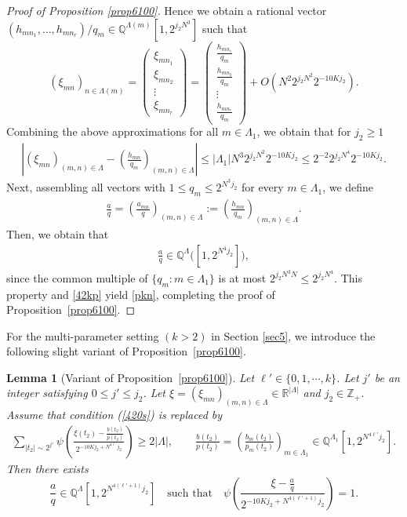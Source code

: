 \documentclass[10pt,a4paper]{amsart}
\newtheorem{lemma}{Lemma}\numberwithin{lemma}{section}
\numberwithin{equation}{section}
\begin{document}
\begin{proof}[Proof of Proposition \ref{prop6100}]
Hence we obtain a rational vector 
$(h_{mn_1}, \dots, h_{mn_r})/q_m 
\in \mathbb{Q}^{\Lambda(m)}[1, 2^{j_2 N^3}]$ 
such that
\[
(\xi_{mn})_{n \in \Lambda(m)} =
\begin{pmatrix}
\xi_{mn_1}\\
\xi_{mn_2}\\
\vdots\\
\xi_{mn_r}
\end{pmatrix}
=
\left(\begin{matrix}\frac{h_{mn_1}}{q_m}\\
\frac{h_{mn_2}}{q_m}\\
 \vdots\\
\frac{h_{mn_{r}}}{q_m}
  \end{matrix}\right)
+ O\!\left(N^2 2^{j_2 N^2} 2^{-10Kj_2}\right).
\]
  Combining the above approximations for  all $m \in \Lambda_1$, we obtain that for $j_2\ge 1$
\begin{align}\label{42kp}
\left|
(\xi_{mn})_{(m,n)\in \Lambda}
- 
\left(\frac{h_{mn}}{q_m}\right)_{(m,n)\in \Lambda}
\right|
\le |\Lambda_1|
 N^3 2^{j_2 N^2} 2^{-10Kj_2}
\le 
2^{-2}2^{j_2 N^4} 2^{-10Kj_2}.
\end{align}
Next, assembling all vectors  with 
$1 \le q_m \le 2^{N^3 j_2}$ for every $m \in \Lambda_1$, 
we define
\begin{align}\label{yy}
\frac{a}{q}
=
\left( \frac{a_{mn}}{q} \right)_{(m,n)\in \Lambda}
:=
\left( \frac{h_{mn}}{q_m} \right)_{(m,n)\in \Lambda}.
\end{align} Then, we obtain that  \begin{align}\label{ep1}
\frac{a}{q} \in \mathbb{Q}^{\Lambda}\big([1, 2^{N^4 j_2}]\big),
\end{align} 
since the common multiple of $\{ q_m : m \in \Lambda_1 \}$ 
is at most $2^{j_2 N^3N} \le 2^{j_2 N^4}$.
This property and \eqref{42kp} yield \eqref{pkn}, completing the proof of Proposition~\ref{prop6100}.
\end{proof} 
For the multi-parameter setting $(k>2)$ in Section \ref{sec5}, we introduce the following slight variant of Proposition~\ref{prop6100}.
\begin{lemma}[Variant of Proposition~\ref{prop6100}]\label{vari61}
Let $\ell'\in  \{0,1,\cdots,k\}$.  Let $j'$ be an integer satisfying $0\leq j'\leq j_2$. Let $\xi=(\xi_{mn})_{(m,n)\in \Lambda}\in \mathbb{R}^{|\Lambda|}$ and $j_2\in \mathbb{Z}_{+}$. Assume that condition \emph{(\ref{420s})} is replaced by 
\begin{align*}
\sum_{|t_2| \sim 2^{j'}}
\psi\!\left(
  \frac{\xi(t_2) - \frac{b(t_2)}{p(t_2)}}{2^{-10K j_2 + N^{4\ell'} j_2}}
\right)
\ge 2|\Lambda|,
\qquad
\frac{b(t_2)}{p(t_2)}=\left( \frac{b_m(t_2)}{p_m(t_2)} \right)_{m\in \Lambda_1} \in \mathbb{Q}^{\Lambda_1}\!\left[1, 2^{N^{4\ell'} j_2}\right].
\end{align*}
Then there exists
\[
\frac{a}{q} \in \mathbb{Q}^{\Lambda}\!\left[1, 2^{N^{4(\ell'+1)} j_2}\right]
\quad \text{such that} \quad
\psi\!\left(
  \frac{\xi - \frac{a}{q}}{2^{-10K j_2 + N^{4(\ell'+1)} j_2}}
\right) = 1.
\]
\end{lemma}
\end{document}
